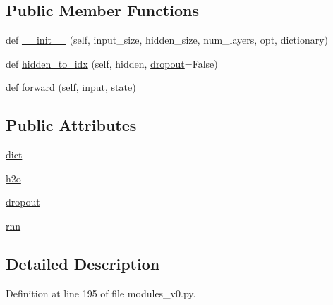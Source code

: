 \subsection*{Public Member Functions}
\begin{DoxyCompactItemize}
\item 
def \hyperlink{classparlai_1_1agents_1_1legacy__agents_1_1memnn_1_1modules__v0_1_1Decoder_ad1d510abd06254aa12ec3f9cc61bb612}{\+\_\+\+\_\+init\+\_\+\+\_\+} (self, input\+\_\+size, hidden\+\_\+size, num\+\_\+layers, opt, dictionary)
\item 
def \hyperlink{classparlai_1_1agents_1_1legacy__agents_1_1memnn_1_1modules__v0_1_1Decoder_aafa684988d164a4ec2cfdb141e1ea31e}{hidden\+\_\+to\+\_\+idx} (self, hidden, \hyperlink{classparlai_1_1agents_1_1legacy__agents_1_1memnn_1_1modules__v0_1_1Decoder_a0116a3c2b822fd074e7f67efc3609b69}{dropout}=False)
\item 
def \hyperlink{classparlai_1_1agents_1_1legacy__agents_1_1memnn_1_1modules__v0_1_1Decoder_a1da4529bbaf122064ff7109fd88cd12a}{forward} (self, input, state)
\end{DoxyCompactItemize}
\subsection*{Public Attributes}
\begin{DoxyCompactItemize}
\item 
\hyperlink{classparlai_1_1agents_1_1legacy__agents_1_1memnn_1_1modules__v0_1_1Decoder_a612b3cfacbcdef8db8a7c6adc45e6695}{dict}
\item 
\hyperlink{classparlai_1_1agents_1_1legacy__agents_1_1memnn_1_1modules__v0_1_1Decoder_add594d5a2a241288c95a899b640b6aca}{h2o}
\item 
\hyperlink{classparlai_1_1agents_1_1legacy__agents_1_1memnn_1_1modules__v0_1_1Decoder_a0116a3c2b822fd074e7f67efc3609b69}{dropout}
\item 
\hyperlink{classparlai_1_1agents_1_1legacy__agents_1_1memnn_1_1modules__v0_1_1Decoder_aa5c0e1fd441c2c00358fa1fc64e86013}{rnn}
\end{DoxyCompactItemize}


\subsection{Detailed Description}


Definition at line 195 of file modules\+\_\+v0.\+py.



